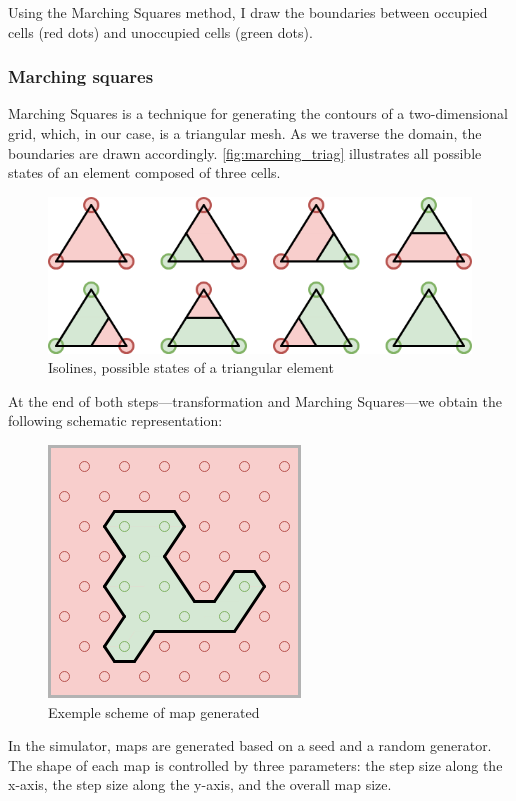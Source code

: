 \documentclass[../main.tex]{subfiles}
\begin{document}
\vspace{0.5em}

Using the Marching Squares method, I draw the boundaries between occupied cells (red dots) and unoccupied cells (green dots).

\subsubsection{Marching squares}

Marching Squares is a technique for generating the contours of a two-dimensional grid, which, in our case, is a triangular mesh. As we traverse the domain, the boundaries are drawn accordingly. \autoref{fig:marching_triag} illustrates all possible states of an element composed of three cells.

\begin{figure}[H]
	\centering
	\includegraphics[width=0.6\linewidth]{IMAGES/part5/marching_square_triangle.png}
	\caption{Isolines, possible states of a triangular element}
	\label{fig:marching_triag}
\end{figure}

At the end of both steps—transformation and Marching Squares—we obtain the following schematic representation:

\begin{figure}[H]
	\centering
	\includegraphics[width=0.3\linewidth]{IMAGES/part5/map_generation_example.png}
	\caption{Exemple scheme of map generated}
	\label{fig:map_gen_scheme}
\end{figure}

In the simulator, maps are generated based on a seed and a random generator. The shape of each map is controlled by three parameters: the step size along the x-axis, the step size along the y-axis, and the overall map size.
\end{document}
